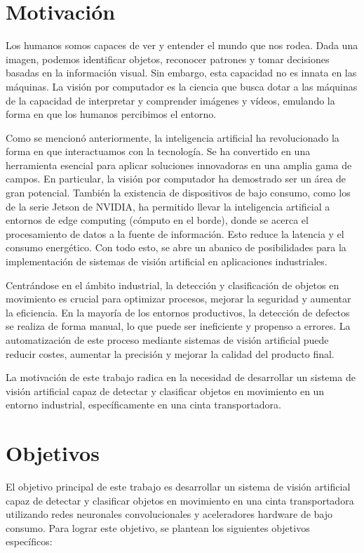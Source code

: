 \documentclass[11pt,spanish,listoffigures,listoftables]{tfgetsinf}
\begin{document}
\section{Motivaci\'on}\label{sec:motivacion}

Los humanos somos capaces de ver y entender el mundo que nos rodea. Dada una imagen, podemos identificar objetos, reconocer patrones y tomar decisiones basadas en la información visual. Sin embargo, esta capacidad no es innata en las máquinas. La visión por computador es la ciencia que busca dotar a las máquinas de la capacidad de interpretar y comprender imágenes y vídeos, emulando la forma en que los humanos percibimos el entorno.

Como se mencionó anteriormente, la inteligencia artificial ha revolucionado la forma en que interactuamos con la tecnología. Se ha convertido en una herramienta esencial para aplicar soluciones innovadoras en una amplia gama de campos. En particular, la visión por computador ha demostrado ser un área de gran potencial. También la existencia de dispositivos de bajo consumo, como los de la serie Jetson de NVIDIA, ha permitido llevar la inteligencia artificial a entornos de edge computing (cómputo en el borde), donde se acerca el procesamiento de datos a la fuente de información. Esto reduce la latencia y el consumo energético. Con todo esto, se abre un abanico de posibilidades para la implementación de sistemas de visión artificial en aplicaciones industriales.

Centrándose en el ámbito industrial, la detección y clasificación de objetos en movimiento es crucial para optimizar procesos, mejorar la seguridad y aumentar la eficiencia. En la mayoría de los entornos productivos, la detección de defectos se realiza de forma manual, lo que puede ser ineficiente y propenso a errores. La automatización de este proceso mediante sistemas de visión artificial puede reducir costes, aumentar la precisión y mejorar la calidad del producto final.


La motivación de este trabajo radica en la necesidad de desarrollar un sistema de visión artificial capaz de detectar y clasificar objetos en movimiento en un entorno industrial, específicamente en una cinta transportadora.


\section{Objetivos}\label{sec:objetivos}

El objetivo principal de este trabajo es desarrollar un sistema de visión artificial capaz de detectar y clasificar objetos en movimiento en una cinta transportadora utilizando redes neuronales convolucionales y aceleradores hardware de bajo consumo. Para lograr este objetivo, se plantean los siguientes objetivos específicos:
\end{document}

